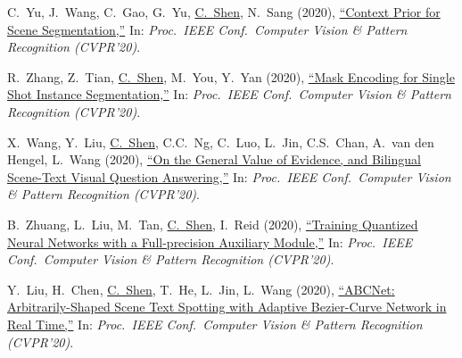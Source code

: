 \documentclass[9pt, a4paper]{article}
\newcommand{\years}[1]{\marginnote{\scriptsize #1}}
\def\highlight{\uline}
\begin{document}
\medskip

\years{2020} C.~Yu, J.~Wang, C.~Gao, G.~Yu, \highlight{C.~Shen}, N.~Sang (2020),
\href{http://www.google.com/search?lr=&ie=UTF-8&oe=UTF-8&q=Context+Prior+for+Scene+Segmentation+Changqian+Yu%2C+Jingbo+Wang%2C+Changxin+Gao%2C+Gang+Yu%2C+Chunhua+Shen%2C+Nong+Sang}{``Context Prior for Scene Segmentation,{}''}
In: \emph{Proc.\ IEEE Conf.\  Computer Vision \& Pattern Recognition (CVPR'20)}.

\medskip

\years{2020} R.~Zhang, Z.~Tian, \highlight{C.~Shen}, M.~You, Y.~Yan (2020),
\href{http://www.google.com/search?lr=&ie=UTF-8&oe=UTF-8&q=Mask+Encoding+for+Single+Shot+Instance+Segmentation+Rufeng+Zhang%2C+Zhi+Tian%2C+Chunhua+Shen%2C+Mingyu+You%2C+Youliang+Yan}{``Mask Encoding for Single Shot Instance Segmentation,{}''}
In: \emph{Proc.\ IEEE Conf.\  Computer Vision \& Pattern Recognition (CVPR'20)}.

\medskip

\years{2020} X.~Wang, Y.~Liu, \highlight{C.~Shen}, C.C.~Ng, C.~Luo, L.~Jin, C.S.~Chan, A.~van den Hengel, L.~Wang (2020),
\href{http://www.google.com/search?lr=&ie=UTF-8&oe=UTF-8&q=On+the+General+Value+of+Evidence%2C+and+Bilingual+Scene-Text+Visual+Question+Answering+Xinyu+Wang%2C+Yuliang+Liu%2C+Chunhua+Shen%2C+Chun+Chet+Ng%2C+Canjie+Luo%2C+Lianwen+Jin%2C+Chee+Seng+Chan%2C+Anton+van+den+Hengel%2C+Liangwei+Wang}{``On the General Value of Evidence, and Bilingual Scene-Text Visual Question Answering,{}''}
In: \emph{Proc.\ IEEE Conf.\  Computer Vision \& Pattern Recognition (CVPR'20)}.

\medskip

\years{2020} B.~Zhuang, L.~Liu, M.~Tan, \highlight{C.~Shen}, I.~Reid (2020),
\href{http://www.google.com/search?lr=&ie=UTF-8&oe=UTF-8&q=Training+Quantized+Neural+Networks+with+a+Full-precision+Auxiliary+Module+Bohan+Zhuang%2C+Lingqiao+Liu%2C+Mingkui+Tan%2C+Chunhua+Shen%2C+Ian+Reid}{``Training Quantized Neural Networks with a Full-precision Auxiliary Module,{}''}
In: \emph{Proc.\ IEEE Conf.\  Computer Vision \& Pattern Recognition (CVPR'20)}.

\medskip

\years{2020} Y.~Liu, H.~Chen, \highlight{C.~Shen}, T.~He, L.~Jin, L.~Wang (2020),
\href{http://www.google.com/search?lr=&ie=UTF-8&oe=UTF-8&q=ABCNet%3A+Arbitrarily-Shaped+Scene+Text+Spotting+with+Adaptive+Bezier-Curve+Network+in+Real+Time+Yuliang+Liu%2C+Hao+Chen%2C+Chunhua+Shen%2C+Tong+He%2C+Lianwen+Jin%2C+Liangwei+Wang}{``{ABCNet}: Arbitrarily-Shaped Scene Text Spotting with Adaptive {B}ezier-Curve Network in Real Time,{}''}
In: \emph{Proc.\ IEEE Conf.\  Computer Vision \& Pattern Recognition (CVPR'20)}.
\end{document}
